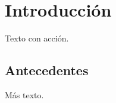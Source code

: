\documentclass{article}
\begin{document}
\tableofcontents
\section{Introducción}
Texto con acción.
\subsection{Antecedentes}
Más texto.
\end{document}
